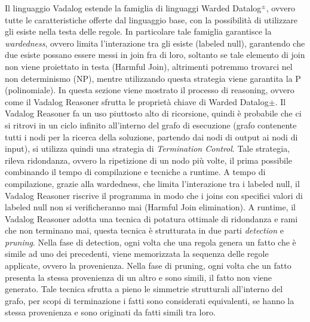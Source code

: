 Il linguaggio Vadalog estende la famiglia di linguaggi Warded Datalog$^\pm $, ovvero tutte le caratteristiche offerte dal linguaggio base, con la possibilità di utilizzare gli esiste nella testa delle regole. \newline
In particolare tale famiglia garantisce la \textit{wardedness}, ovvero limita l'interazione tra gli esiste (labeled null), garantendo che due esiste possano essere messi in join fra di loro, soltanto se tale elemento di join non viene proiettato in testa (Harmful Join), altrimenti potremmo trovarci nel non determinismo (NP), mentre utilizzando questa strategia viene garantita la P  (polinomiale).\newline \newline
In questa sezione viene mostrato il processo di reasoning, ovvero come il Vadalog Reasoner sfrutta le proprietà chiave di Warded Datalog$\pm$. \newline
Il Vadalog Reasoner fa un uso piuttosto alto di ricorsione, quindi è probabile che ci si ritrovi in un ciclo infinito all'interno del grafo di esecuzione (grafo contenente tutti i nodi per la ricerca della soluzione, partendo dai nodi di output ai nodi di input), si utilizza quindi una strategia di \textit{Termination Control}. \newline
Tale strategia, rileva ridondanza, ovvero la ripetizione di un nodo più volte, il prima possibile combinando il tempo di compilazione e tecniche a runtime. \newline
A tempo di compilazione, grazie alla wardedness, che limita l'interazione tra i labeled null, il Vadalog Reasoner riscrive il programma in modo che i joins con specifici valori di labeled null non si verificheranno mai (Harmful Join elimination). \newline
A runtime, il Vadalog Reasoner adotta una tecnica di potatura ottimale di ridondanza e rami che non terminano mai, questa tecnica è strutturata in due parti \emph{detection} e \emph{pruning}. \newline
Nella fase di detection, ogni volta che una regola genera un fatto che è simile ad uno dei precedenti, viene memorizzata la sequenza delle regole applicate, ovvero la provenienza. \newline
Nella fase di pruning, ogni volta che un fatto presenta la stessa provenienza di un altro e sono simili, il fatto non viene generato. \newline
Tale tecnica sfrutta a pieno le simmetrie strutturali all'interno del grafo, per scopi di terminazione i fatti sono considerati equivalenti, se hanno la stessa provenienza e sono originati da fatti simili tra loro. 

